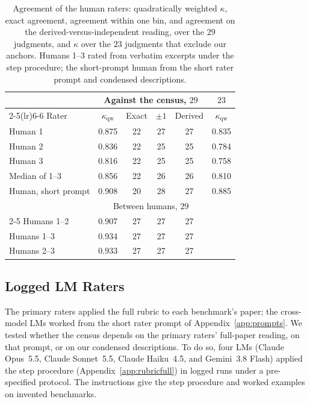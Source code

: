 \documentclass[11pt]{article}
\begin{document}
\begin{table}[ht]\centering\small
\setlength{\tabcolsep}{3pt}
\begin{tabular}{lccccc}
\toprule
 & \multicolumn{4}{c}{Against the census, $29$} & $23$\\
\cmidrule(lr){2-5}\cmidrule(lr){6-6}
Rater & $\kappa_{\text{qw}}$ & Exact & $\pm1$ & Derived & $\kappa_{\text{qw}}$\\
\midrule
Human 1 & 0.875 & 22 & 27 & 27 & 0.835\\
Human 2 & 0.836 & 22 & 25 & 25 & 0.784\\
Human 3 & 0.816 & 22 & 25 & 25 & 0.758\\
Median of 1--3 & 0.856 & 22 & 26 & 26 & 0.810\\
Human, short prompt & 0.908 & 20 & 28 & 27 & 0.885\\
\midrule
 & \multicolumn{4}{c}{Between humans, $29$} & \\
\cmidrule(lr){2-5}
Humans 1--2 & 0.907 & 27 & 27 & 27 & \\
Humans 1--3 & 0.934 & 27 & 27 & 27 & \\
Humans 2--3 & 0.933 & 27 & 27 & 27 & \\
\bottomrule
\end{tabular}
\caption{Agreement of the human raters: quadratically weighted $\kappa$, exact agreement, agreement within one bin, and agreement on the derived-versus-independent reading, over the $29$ judgments, and $\kappa$ over the $23$ judgments that exclude our anchors. Humans 1--3 rated from verbatim excerpts under the step procedure; the short-prompt human from the short rater prompt and condensed descriptions.}
\label{tab:humanraters}
\end{table}

\subsection{Logged LM Raters}
\label{app:llmpanel}
The primary raters applied the full rubric to each benchmark's paper; the cross-model LMs worked from the short rater prompt of Appendix~\ref{app:prompts}. We tested whether the census depends on the primary raters' full-paper reading, on that prompt, or on our condensed descriptions. To do so, four LMs (Claude Opus~5.5, Claude Sonnet~5.5, Claude Haiku~4.5, and Gemini~3.8 Flash) applied the step procedure (Appendix~\ref{app:rubricfull}) in logged runs under a pre-specified protocol. The instructions give the step procedure and worked examples on invented benchmarks.
\end{document}
